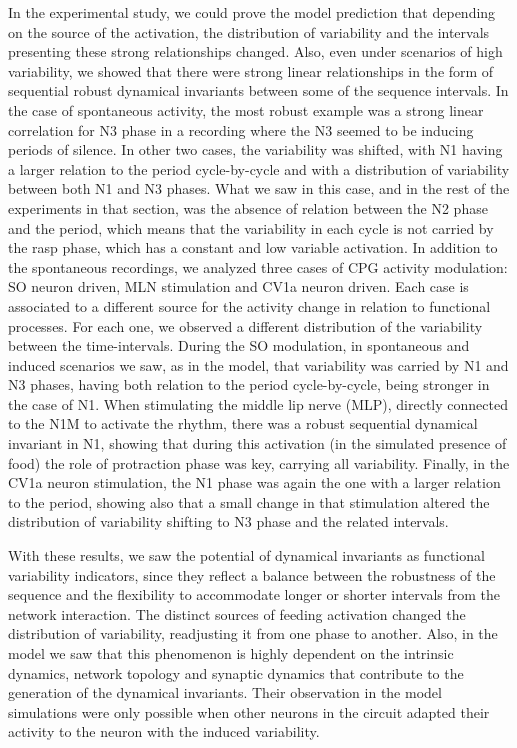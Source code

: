In the experimental study, we could prove the model prediction that depending on the source of the activation, the distribution of variability and the intervals presenting these strong relationships changed. Also, even under scenarios of high variability, we showed that there were strong linear relationships in the form of sequential robust dynamical invariants between some of the sequence intervals. In the case of spontaneous activity, the most robust example was a strong linear correlation for N3 phase in a recording where the N3 seemed to be inducing periods of silence. In other two cases, the variability was shifted, with N1 having a larger relation to the period cycle-by-cycle and with a distribution of variability between both N1 and N3 phases. What we saw in this case, and in the rest of the experiments in that section, was the absence of relation between the N2 phase and the period, which means that the variability in each cycle is not carried by the rasp phase, which has a constant and low variable activation. In addition to the spontaneous recordings, we analyzed three cases of CPG activity modulation: SO neuron driven, MLN stimulation and CV1a neuron driven. Each case is associated to a different source for the activity change in relation to functional processes. For each one, we observed a different distribution of the variability between the time-intervals. During the SO modulation, in spontaneous and induced scenarios we saw, as in the model, that variability was carried by N1 and N3 phases, having both relation to the period cycle-by-cycle, being stronger in the case of N1. When stimulating the middle lip nerve (MLP), directly connected to the N1M to activate the rhythm, there was a robust sequential dynamical invariant in N1, showing that during this activation (in the simulated presence of food) the role of protraction phase was key, carrying all variability. Finally, in the CV1a neuron stimulation, the N1 phase was again the one with a larger relation to the period, showing also that a small change in that stimulation altered the distribution of variability shifting to N3 phase and the related intervals. 

With these results, we saw the potential of dynamical invariants as functional variability indicators, since they reflect a balance between the robustness of the sequence and the flexibility to accommodate longer or shorter intervals from the network interaction. The distinct sources of feeding activation changed the distribution of variability, readjusting it from one phase to another. Also, in the model we saw that this phenomenon is highly dependent on the intrinsic dynamics, network topology and synaptic dynamics that contribute to the generation of the dynamical invariants. Their observation in the model simulations were only possible when other neurons in the circuit adapted their activity to the neuron with the induced variability. 

